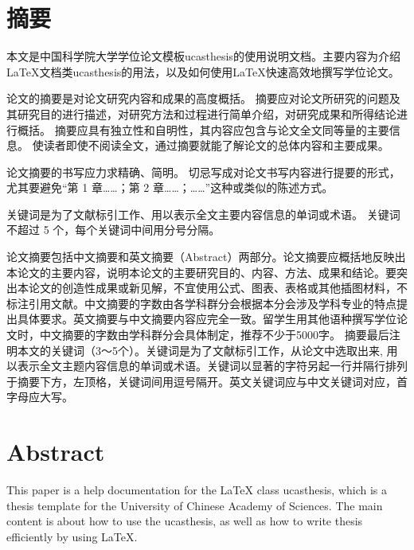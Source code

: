 
\maketitle%
\MAKETITLE%

\makedeclaration%

\intobmk\chapter*{\texorpdfstring{摘\quad 要}{摘要}}
\setcounter{page}{1}%

本文是中国科学院大学学位论文模板ucasthesis的使用说明文档。主要内容为介绍\LaTeX{}文档类ucasthesis的用法，以及如何使用\LaTeX{}快速高效地撰写学位论文。

  论文的摘要是对论文研究内容和成果的高度概括。
  摘要应对论文所研究的问题及其研究目的进行描述，对研究方法和过程进行简单介绍，对研究成果和所得结论进行概括。
  摘要应具有独立性和自明性，其内容应包含与论文全文同等量的主要信息。
  使读者即使不阅读全文，通过摘要就能了解论文的总体内容和主要成果。

  论文摘要的书写应力求精确、简明。
  切忌写成对论文书写内容进行提要的形式，尤其要避免“第 1 章……；第 2 章……；……”这种或类似的陈述方式。

  关键词是为了文献标引工作、用以表示全文主要内容信息的单词或术语。
  关键词不超过 5 个，每个关键词中间用分号分隔。
  
  论文摘要包括中文摘要和英文摘要（Abstract）两部分。论文摘要应概括地反映出本论文的主要内容，说明本论文的主要研究目的、内容、方法、成果和结论。要突出本论文的创造性成果或新见解，不宜使用公式、图表、表格或其他插图材料，不标注引用文献。中文摘要的字数由各学科群分会根据本分会涉及学科专业的特点提出具体要求。英文摘要与中文摘要内容应完全一致。留学生用其他语种撰写学位论文时，中文摘要的字数由学科群分会具体制定，推荐不少于5000字。
摘要最后注明本文的关键词（3～5个）。关键词是为了文献标引工作，从论文中选取出来, 用以表示全文主题内容信息的单词或术语。关键词以显著的字符另起一行并隔行排列于摘要下方，左顶格，关键词间用逗号隔开。英文关键词应与中文关键词对应，首字母应大写。




\intobmk\chapter*{Abstract}%

This paper is a help documentation for the \LaTeX{} class ucasthesis, which is  a thesis template for the University of Chinese Academy of Sciences. The main content is about how to use the ucasthesis, as well as how to write thesis efficiently by using \LaTeX{}.


